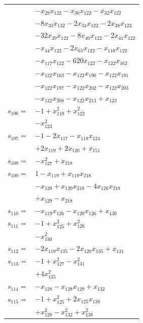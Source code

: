 \begin{longtable}{@{}r@{\;}l@{}}
 & \(\displaystyle -x_{28}x_{122} -x_{30}x_{122} -x_{32}x_{122}\) \\
 & \(\displaystyle -8x_{33}x_{122} -2x_{34}x_{122} -2x_{38}x_{122}\) \\
 & \(\displaystyle -32x_{39}x_{122} -8x_{40}x_{122} -2x_{41}x_{122}\) \\
 & \(\displaystyle -x_{44}x_{122} -2x_{65}x_{122} -x_{116}x_{122}\) \\
 & \(\displaystyle -x_{117}x_{122} -620x_{122} -x_{122}x_{162}\) \\
 & \(\displaystyle -x_{122}x_{163} -x_{122}x_{190} -x_{122}x_{191}\) \\
 & \(\displaystyle -x_{122}x_{197} -x_{122}x_{202} -x_{122}x_{203}\) \\
 & \(\displaystyle -x_{122}x_{208} -x_{122}x_{213} +x_{123}\) \\[3pt]
\(s_{106}=\) & \(\displaystyle -1 +x_{119}^{2} +x_{122}^{2}\) \\
 & \(\displaystyle -x_{123}^{2}\) \\[3pt]
\(s_{107}=\) & \(\displaystyle -1 -2x_{117} -x_{118}x_{124}\) \\
 & \(\displaystyle +2x_{119} +2x_{120} +x_{151}\) \\[3pt]
\(s_{108}=\) & \(\displaystyle -x_{127}^{2} +x_{218}\) \\[3pt]
\(s_{109}=\) & \(\displaystyle 1 -x_{119} +x_{119}x_{218}\) \\
 & \(\displaystyle -x_{120} +x_{120}x_{218} -4x_{126}x_{218}\) \\
 & \(\displaystyle +x_{129} -x_{218}\) \\[3pt]
\(s_{110}=\) & \(\displaystyle -x_{119}x_{126} -x_{120}x_{126} +x_{130}\) \\[3pt]
\(s_{111}=\) & \(\displaystyle -1 +x_{125}^{2} +x_{126}^{2}\) \\
 & \(\displaystyle -x_{130}^{2}\) \\[3pt]
\(s_{112}=\) & \(\displaystyle -2x_{119}x_{135} -2x_{120}x_{135} +x_{131}\) \\[3pt]
\(s_{113}=\) & \(\displaystyle -1 +x_{127}^{2} -x_{131}^{2}\) \\
 & \(\displaystyle +4x_{135}^{2}\) \\[3pt]
\(s_{114}=\) & \(\displaystyle -x_{128} -x_{128}x_{129} +x_{132}\) \\[3pt]
\(s_{115}=\) & \(\displaystyle -1 +x_{125}^{2} +2x_{125}x_{138}\) \\
 & \(\displaystyle +x_{128}^{2} -x_{132}^{2} +x_{138}^{2}\) \\[3pt]

\end{longtable}
